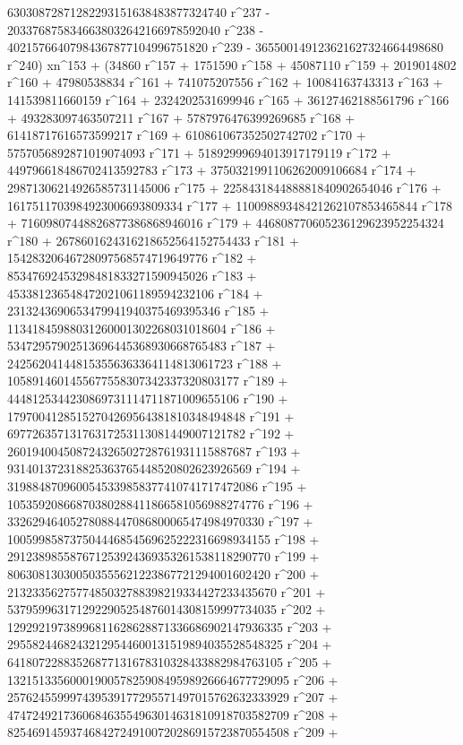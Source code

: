        63030872871282293151638483877324740 r^237 - 
       2033768758346638032642166978592040 r^238 - 
       40215766407984367877104996751820 r^239 - 
       365500149123621627324664498680 r^240) xn^153 + (34860 r^157 + 
       1751590 r^158 + 45087110 r^159 + 2019014802 r^160 + 
       47980538834 r^161 + 741075207556 r^162 + 
       10084163743313 r^163 + 141539811660159 r^164 + 
       2324202531699946 r^165 + 36127462188561796 r^166 + 
       493283097463507211 r^167 + 5787976476399269685 r^168 + 
       61418717616573599217 r^169 + 610861067352502742702 r^170 + 
       5757056892871019074093 r^171 + 51892999694013917179119 r^172 + 
       449796618486702413592783 r^173 + 
       3750321991106262009106684 r^174 + 
       29871306214926585731145006 r^175 + 
       225843184488881840902654046 r^176 + 
       1617511703984923006693809334 r^177 + 
       11009889348421262107853465844 r^178 + 
       71609807448826877386868946016 r^179 + 
       446808770605236129623952254324 r^180 + 
       2678601624316218652564152754433 r^181 + 
       15428320646728097568574719649776 r^182 + 
       85347692453298481833271590945026 r^183 + 
       453381236548472021061189594232106 r^184 + 
       2313243690653479941940375469395346 r^185 + 
       11341845988031260001302268031018604 r^186 + 
       53472957902513696445368930668765483 r^187 + 
       242562041448153556363364114813061723 r^188 + 
       1058914601455677558307342337320803177 r^189 + 
       4448125344230869731114711871009655106 r^190 + 
       17970041285152704269564381810348494848 r^191 + 
       69772635713176317253113081449007121782 r^192 + 
       260194004508724326502728761931115887687 r^193 + 
       931401372318825363765448520802623926569 r^194 + 
       3198848709600545339858377410741717472086 r^195 + 
       10535920866870380288411866581056988274776 r^196 + 
       33262946405278088447086800065474984970330 r^197 + 
       100599858737504446854569625222316698934155 r^198 + 
       291238985587671253924369353261538118290770 r^199 + 
       806308130300503555621223867721294001602420 r^200 + 
       2132335627577485032788398219334427233435670 r^201 + 
       5379599631712922905254876014308159997734035 r^202 + 
       12929219738996811628628871336686902147936335 r^203 + 
       29558244682432129544600131519894035528548325 r^204 + 
       64180722883526877131678310328433882984763105 r^205 + 
       132151335600019005782590849598926664677729095 r^206 + 
       257624559997439539177295571497015762632333929 r^207 + 
       474724921736068463554963014631810918703582709 r^208 + 
       825469145937468427249100720286915723870554508 r^209 + 
